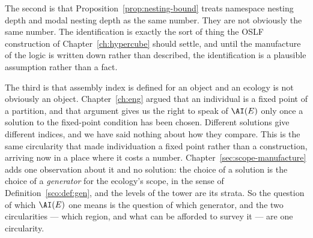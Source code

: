 The second is that Proposition~\ref{prop:nesting-bound} treats namespace
nesting depth and modal nesting depth as the same number.
They are not obviously the same number.
The identification is exactly the sort of thing the OSLF construction of
Chapter~\ref{ch:hypercube} should settle, and until the manufacture of
the logic is written down rather than described, the identification is a
plausible assumption rather than a fact.

The third is that assembly index is defined for an object and an ecology
is not obviously an object.
Chapter~\ref{ch:eng} argued that an individual is a fixed point of a
partition, and that argument gives us the right to speak of $\AI(E)$ only
once a solution to the fixed-point condition has been chosen.
Different solutions give different indices, and we have said nothing
about how they compare.
This is the same circularity that made individuation a fixed point rather
than a construction, arriving now in a place where it costs a number.
Chapter~\ref{sec:scope-manufacture} adds one observation about it and no
solution: the choice of a solution is the choice of a \emph{generator}
for the ecology's scope, in the sense of
Definition~\ref{sco:def:gen}, and the levels of the tower are its strata.
So the question of which $\AI(E)$ one means is the question of which
generator, and the two circularities --- which region, and what can be
afforded to survey it --- are one circularity.

